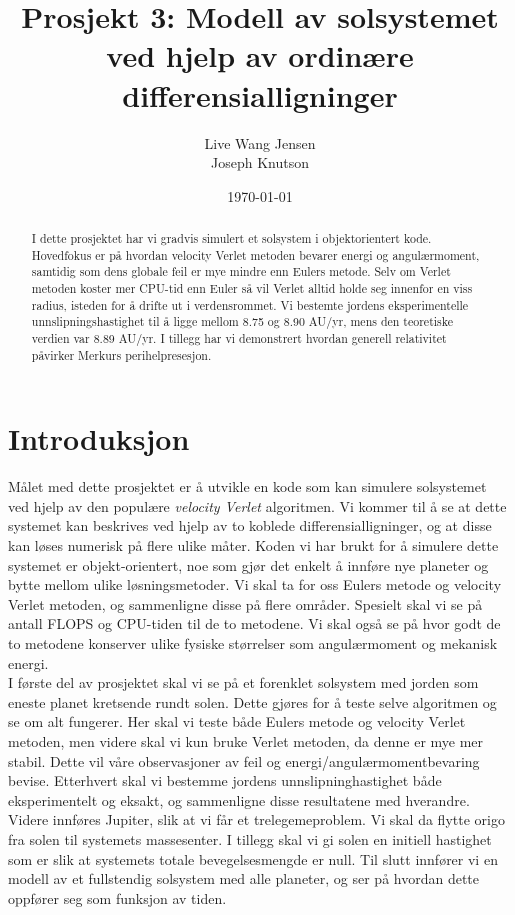 \documentclass[11pt,a4paper]{article}
\begin{document}
\title{Prosjekt 3: Modell av solsystemet ved hjelp av ordinære differensialligninger }
\author{Live Wang Jensen \\ Joseph Knutson}
\date{\today}

\maketitle

\begin{abstract}
I dette prosjektet har vi gradvis simulert et solsystem i objektorientert kode. Hovedfokus er på hvordan velocity Verlet  metoden
bevarer energi og angulærmoment, samtidig som dens globale feil er mye mindre enn Eulers metode. Selv om Verlet metoden koster mer CPU-tid enn Euler så vil Verlet alltid holde seg innenfor en viss radius, isteden for å drifte ut i verdensrommet.
Vi bestemte jordens eksperimentelle unnslipningshastighet til å ligge mellom 8.75 og 8.90 AU/yr, mens den teoretiske verdien var 8.89 AU/yr. I tillegg har vi demonstrert hvordan generell relativitet påvirker Merkurs perihelpresesjon.
\end{abstract}

\tableofcontents

\clearpage
\section{Introduksjon}
Målet med dette prosjektet er å utvikle en kode som kan simulere solsystemet ved hjelp av den populære \textit{velocity Verlet} algoritmen. Vi kommer til å se at dette systemet kan beskrives ved hjelp av to koblede differensialligninger, og at disse kan løses numerisk på flere ulike måter. Koden vi har brukt for å simulere dette systemet er objekt-orientert, noe som gjør det enkelt å innføre nye planeter og bytte mellom ulike løsningsmetoder. Vi skal ta for oss Eulers metode og velocity Verlet metoden, og sammenligne disse på flere områder. Spesielt skal vi se på antall FLOPS og CPU-tiden til de to metodene. Vi skal også se på hvor godt de to metodene konserver ulike fysiske størrelser som angulærmoment og mekanisk energi. \\

I første del av prosjektet skal vi se på et forenklet solsystem med jorden som eneste planet kretsende rundt solen. Dette gjøres for å teste selve algoritmen og se om alt fungerer. Her skal vi teste både Eulers metode og velocity Verlet metoden, men videre skal vi kun bruke Verlet metoden, da denne er mye mer stabil. Dette vil våre observasjoner av feil og energi/angulærmomentbevaring bevise. Etterhvert skal vi bestemme jordens unnslipninghastighet både eksperimentelt og eksakt, og sammenligne disse resultatene med hverandre. Videre innføres Jupiter, slik at vi får et trelegemeproblem. Vi skal da flytte origo fra solen til systemets massesenter. I tillegg skal vi gi solen en initiell hastighet som er slik at systemets totale bevegelsesmengde er null. Til slutt innfører vi en modell av et fullstendig solsystem med alle planeter, og ser på hvordan dette oppfører seg som funksjon av tiden. \\
\end{document}
